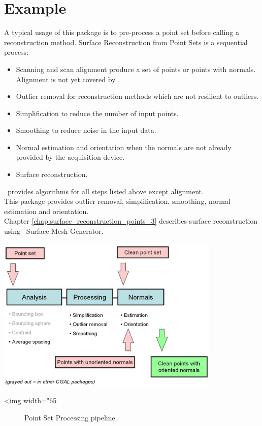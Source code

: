 \section{Example}

A typical usage of this package is to pre-process a point set before calling a reconstruction method.
Surface Reconstruction from Point Sets is a sequential process:

\begin{itemize}
\item Scanning and scan alignment produce a set of points
      or points with normals. Alignment is not yet
      covered by \cgal.
\item Outlier removal for reconstruction methods which
      are not resilient to outliers.
\item Simplification to reduce the number of input points.
\item Smoothing to reduce noise in the input data.
\item Normal estimation and orientation when the normals
      are not already provided by the acquisition device.
\item Surface reconstruction.
\end{itemize}

\cgal\ provides algorithms for all steps listed above except alignment.\\
This package provides outlier removal, simplification, smoothing,
normal estimation and orientation.\\
Chapter  \ref{chap:surface_reconstruction_points_3}
describes surface reconstruction using \cgal\ Surface Mesh Generator.

\begin{center}
    \label{Point_set_processing_3-fig-pipeline}
    \begin{ccTexOnly}
        \includegraphics[width=0.8\textwidth]{Point_set_processing_3/pipeline} %
    \end{ccTexOnly}
    \begin{ccHtmlOnly}
        <img width="65%
    \end{ccHtmlOnly}
    \begin{figure}[h]
        \caption{Point Set Processing pipeline.}
    \end{figure}
\end{center}


